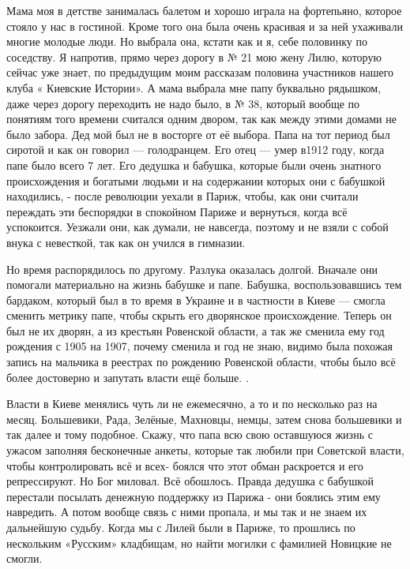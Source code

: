 Мама моя в детстве занималась балетом и
хорошо играла на фортепьяно, которое стояло у нас в гостиной. Кроме того она
была очень красивая и за ней ухаживали многие молодые люди. Но выбрала она,
кстати  как и я,  себе половинку по соседству. Я напротив, прямо через
дорогу в № 21 мою жену Лилю, которую сейчас  уже знает, по предыдущим моим
рассказам   половина участников нашего клуба « Киевские Истории».  А мама
выбрала мне папу буквально  рядышком, даже через дорогу переходить не надо
было, в № 38, который вообще по понятиям того времени считался одним двором,
так как между этими домами не было забора. Дед мой был не в восторге от её
выбора. Папа на тот период был сиротой и как он говорил — голодранцем. Его
отец — умер в1912 году, когда папе было всего 7 лет. Его дедушка и бабушка,
которые были очень знатного происхождения и богатыми людьми и на содержании
которых они с бабушкой находились, - после революции уехали в Париж, чтобы,
как они считали  переждать эти беспорядки в спокойном Париже и вернуться,
когда всё успокоится. Уезжали они, как думали, не навсегда, поэтому и не
взяли с собой внука с невесткой, так как он учился в гимназии. 


Но время
распорядилось по другому. Разлука оказалась долгой. Вначале они помогали
материально на жизнь бабушке и папе. Бабушка, воспользовавшись тем бардаком,
который был в то время в  Украине и в частности в Киеве — смогла сменить
метрику папе, чтобы скрыть его дворянское происхождение. Теперь он был не их
дворян, а из крестьян Ровенской области, а так же сменила ему год рождения с
1905 на 1907, почему сменила  и год не знаю, видимо была похожая запись на
мальчика в реестрах по рождению Ровенской области, чтобы было всё более
достоверно и запутать власти ещё больше. . 


Власти в Киеве менялись чуть ли не ежемесячно, а то и по несколько раз на
месяц. Большевики, Рада, Зелёные, Махновцы, немцы, затем снова большевики и так
далее и тому подобное.  Скажу, что папа всю свою оставшуюся жизнь с ужасом
заполняя бесконечные анкеты, которые так любили при Советской власти, чтобы
контролировать всё и всех-  боялся что этот обман раскроется и его
репрессируют.  Но Бог миловал.  Всё обошлось. Правда дедушка с бабушкой
перестали посылать денежную поддержку из Парижа - они боялись этим ему
навредить. А потом вообще связь с ними пропала, и мы так и не знаем их
дальнейшую судьбу. Когда мы с Лилей были в Париже, то прошлись по нескольким
«Русским» кладбищам, но найти могилки с фамилией Новицкие не смогли.  

